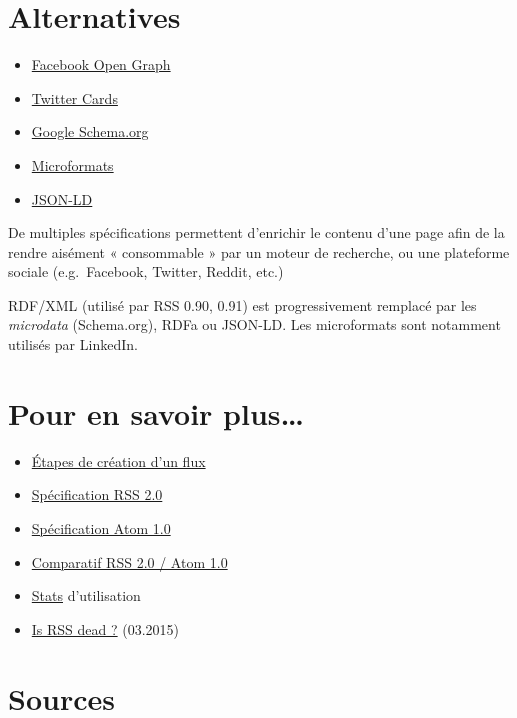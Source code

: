 \hypertarget{alternatives}{%
\section{Alternatives}\label{alternatives}}

\begin{itemize}
\tightlist
\item
  \href{http://ogp.me/}{Facebook Open Graph}
\item
  \href{https://dev.twitter.com/cards/overview}{Twitter Cards}
\item
  \href{http://schema.org/}{Google Schema.org}
\item
  \href{http://microformats.org/}{Microformats}
\item
  \href{http://json-ld.org/}{JSON-LD}
\end{itemize}

De multiples spécifications permettent d'enrichir le contenu d'une page
afin de la rendre aisément « consommable » par un moteur de recherche,
ou une plateforme sociale (e.g.~Facebook, Twitter, Reddit, etc.)

RDF/XML (utilisé par RSS 0.90, 0.91) est progressivement remplacé par
les \emph{microdata} (Schema.org), RDFa ou JSON-LD. Les microformats
sont notamment utilisés par LinkedIn.

\hypertarget{pour-en-savoir-plus}{%
\section{Pour en savoir plus\ldots{}}\label{pour-en-savoir-plus}}

\begin{itemize}
\tightlist
\item
  \href{http://www.xul.fr/xml-rss.html}{Étapes de création d'un flux}
\item
  \href{http://www.rssboard.org/rss-specification}{Spécification RSS
  2.0}
\item
  \href{https://tools.ietf.org/html/rfc4287}{Spécification Atom 1.0}
\item
  \href{http://www.differencebetween.info/difference-between-rss-and-atom}{Comparatif
  RSS 2.0 / Atom 1.0}
\item
  \href{https://trends.builtwith.com/feeds}{Stats} d'utilisation
\item
  \href{http://www.makeuseof.com/tag/rss-dead-look-numbers/}{Is RSS dead
  ?} (03.2015)
\end{itemize}

\begin{otherlanguage}{english}

\end{otherlanguage}

\begin{otherlanguage}{english}

\end{otherlanguage}

\begin{otherlanguage}{english}

\end{otherlanguage}

\hypertarget{sources}{%
\section{Sources}\label{sources}}
